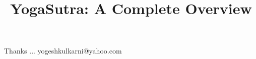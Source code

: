 \documentclass[xcolor=dvipsnames,compress,t,pdf,9pt]{beamer}
\title[\insertframenumber /\inserttotalframenumber]{YogaSutra: A Complete Overview}
\begin{document}
	\begin{frame}
	\titlepage
	\end{frame}

	

	\begin{frame}[c]{}
	Thanks ...
	\vspace{5mm}
	yogeshkulkarni@yahoo.com
	\end{frame}
\end{document}

